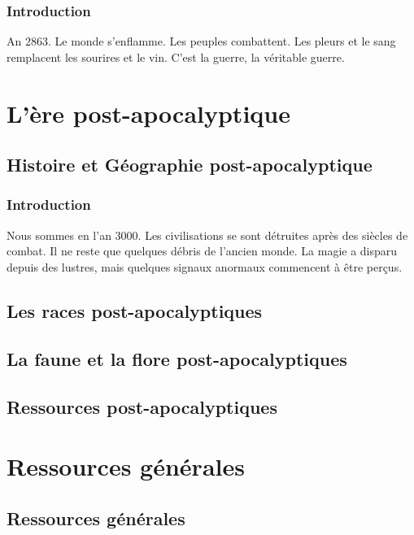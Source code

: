 \documentclass{book}
\makeatletter
\newcommand{\partimage}[2][]{\gdef\@partimage{\texttt{[image: \#2]}}}
\makeatother
\begin{document}
\section{Introduction}
An 2863. Le monde s'enflamme. Les peuples combattent. Les pleurs et le sang remplacent les sourires et le vin. C'est la guerre, la véritable guerre.


\partimage[scale=0.2]{./Ressources/post-apoca/post-apoca.jpg}
\part{L'ère post-apocalyptique}
\chapter{Histoire et Géographie post-apocalyptique}
\section{Introduction}
Nous sommes en l'an 3000. Les civilisations se sont détruites après des siècles de combat. 
Il ne reste que quelques débris de l'ancien monde. 
La magie a disparu depuis des lustres, mais quelques signaux anormaux commencent à être perçus.


\chapter{Les races post-apocalyptiques}

\chapter{La faune et la flore post-apocalyptiques}


\chapter{Ressources post-apocalyptiques}


\partimage[scale=0.85]{./Ressources/biblio.jpg}
\part{Ressources générales}
\chapter*{Ressources générales}
\end{document}
